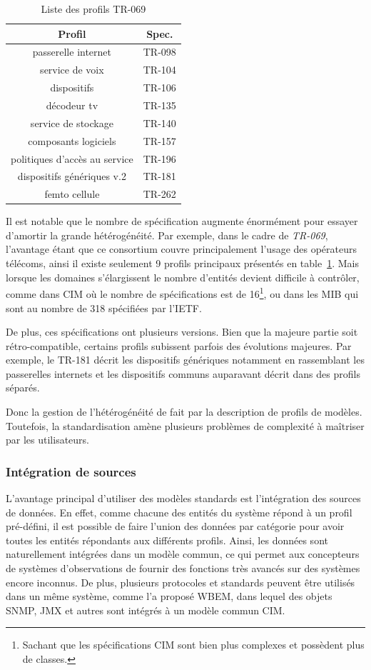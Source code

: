 \begin{table}
\centering
{\scriptsize
\begin{tabular}{cc}
\toprule
Profil & Spec. \\ \toprule
passerelle internet & TR-098 \\ \midrule
service de voix & TR-104 \\ \midrule
dispositifs & TR-106 \\ \midrule
décodeur tv & TR-135 \\ \midrule
service de stockage & TR-140 \\ \midrule
composants logiciels & TR-157 \\ \midrule
politiques d'accès au service &  TR-196 \\ \midrule
dispositifs génériques v.2 & TR-181 \\  \midrule
femto cellule & TR-262 \\ \bottomrule
\end{tabular}
}
\caption{Liste  des profils TR-069}\label{tab:rw:supervision:tr069dm}
\end{table}
Il est notable que le nombre de spécification augmente énormément pour essayer d'amortir la grande hétérogénéité. Par exemple, dans le cadre de \textit{TR-069}, l'avantage étant que ce consortium couvre principalement l'usage des opérateurs télécoms, ainsi il existe seulement 9 profils principaux présentés en table~\ref{tab:rw:supervision:tr069dm}. Mais lorsque les domaines s'élargissent le nombre d'entités devient difficile à contrôler, comme dans CIM où le nombre de spécifications est de 16\footnote{Sachant que les spécifications CIM sont bien plus complexes et possèdent plus de classes.}, ou dans les MIB qui sont au nombre de 318 spécifiées par l'IETF.

De plus, ces spécifications ont plusieurs versions. Bien que la majeure partie soit rétro-compatible, certains profils subissent parfois des évolutions majeures. Par exemple, le TR-181 décrit les dispositifs génériques notamment en rassemblant les passerelles internets et les dispositifs communs auparavant décrit dans des profils séparés. 

Donc la gestion de l'hétérogénéité de fait par la description de profils de modèles. Toutefois, la standardisation amène plusieurs problèmes de complexité à maîtriser par les utilisateurs.

\subsubsection{Intégration de sources}
L'avantage principal d'utiliser des modèles standards est l'intégration des sources de données. En effet, comme chacune des entités du système répond à un profil pré-défini, il est possible de faire l'union des données par catégorie pour avoir toutes les entités répondants aux différents profils. Ainsi, les données sont naturellement intégrées dans un modèle commun, ce qui permet aux concepteurs de systèmes d'observations de fournir des fonctions très avancés sur des systèmes encore inconnus. De plus, plusieurs protocoles et standards peuvent être utilisés dans un même système, comme l'a proposé WBEM, dans lequel des objets SNMP, JMX et autres sont intégrés à un modèle commun CIM.

